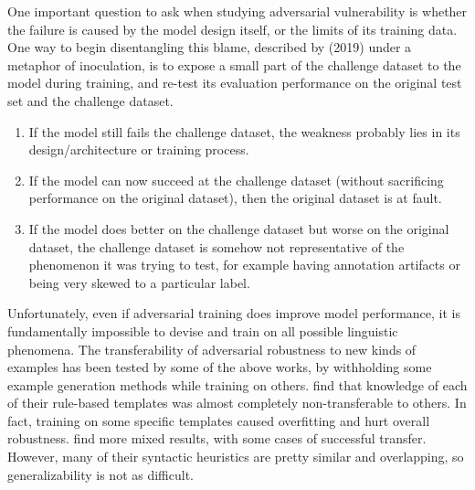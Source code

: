 \documentclass[letterpaper]{article}
\begin{document}
One important question to ask when studying adversarial vulnerability is whether the failure is caused by the model design itself, or the limits of its training data.
One way to begin disentangling this blame, described by \citeauthor{liu_inoculation_2019} (2019) under a metaphor of inoculation, is to expose a small part of the challenge dataset to the model during training, and re-test its evaluation performance on the original test set and the challenge dataset.
\begin{enumerate}
  \item If the model still fails the challenge dataset, the weakness probably lies in its design/architecture or training process.
  \item If the model can now succeed at the challenge dataset (without sacrificing performance on the original dataset), then the original dataset is at fault.
  \item If the model does better on the challenge dataset but worse on the original dataset, the challenge dataset is somehow not representative of the phenomenon it was trying to test, for example having annotation artifacts or being very skewed to a particular label.
\end{enumerate}
Unfortunately, even if adversarial training does improve model performance, it is fundamentally impossible to devise and train on all possible linguistic phenomena.
The transferability of adversarial robustness to new kinds of examples has been tested by some of the above works, by withholding some example generation methods while training on others.
\citeauthor{nie_analyzing_2018} find that knowledge of each of their rule-based templates was almost completely non-transferable to others.
In fact, training on some specific templates caused overfitting and hurt overall robustness.
\citeauthor{mccoy_right_2019} find more mixed results, with some cases of successful transfer.
However, many of their syntactic heuristics are pretty similar and overlapping, so generalizability is not as difficult.
\end{document}
